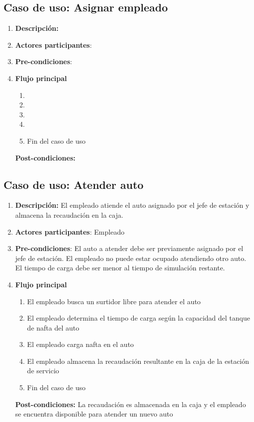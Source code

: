 \documentclass[12pt,a4paper,titlepage,oneside]{article}
\begin{document}
\subsection{Caso de uso: Asignar empleado}

\begin{enumerate}
\item \textbf{Descripción:} 
\item \textbf{Actores participantes}: 
\item \textbf{Pre-condiciones}: 
\item \textbf{Flujo principal}
\begin{enumerate}
\item 
\item 
\item 
\item 
\item Fin del caso de uso
\end{enumerate}
\textbf{Post-condiciones:} 
\end{enumerate}

\subsection{Caso de uso: Atender auto}

\begin{enumerate}
\item \textbf{Descripción:} El empleado atiende el auto asignado por el jefe de estación y almacena la recaudación en la caja.
\item \textbf{Actores participantes}: Empleado
\item \textbf{Pre-condiciones}: El auto a atender debe ser previamente asignado por el jefe de estación. El empleado no puede estar ocupado atendiendo otro auto. El tiempo de carga debe ser menor al tiempo de simulación restante.
\item \textbf{Flujo principal}
\begin{enumerate}
\item El empleado busca un surtidor libre para atender el auto
\item El empleado determina el tiempo de carga según la capacidad del tanque de nafta del auto
\item El empleado carga nafta en el auto
\item El empleado almacena la recaudación resultante en la caja de la estación de servicio
\item Fin del caso de uso
\end{enumerate}
\textbf{Post-condiciones:} La recaudación es almacenada en la caja y el empleado se encuentra disponible para atender un nuevo auto
\end{enumerate}
\end{document}
